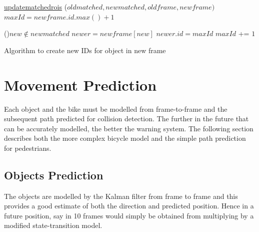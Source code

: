 \documentclass[11pt,twoside]{report}
\begin{document}
\begin{algorithm}
	\DontPrintSemicolon
	\SetAlgoLined
	\underline{update\textunderscore matched\textunderscore rois} ($old$\textunderscore$matched,new$\textunderscore$matched,old$\textunderscore$frame,new$\textunderscore$frame)$\;
	\texttt{\\}
	$maxId = new$\textunderscore$frame.id.max()+1$ 
	
	\ForEach(){$new \notin new$\textunderscore$matched$}{
		$newer = new$\textunderscore$frame[new]$ 
		$newer.id = maxId$ 
		$maxId$ += $1$ 
	}
	\texttt{\\}
	\caption{Algorithm to create new IDs for object in new frame}
	\label{alg:weights}
\end{algorithm}


\section{Movement Prediction}

Each object and the bike must be modelled from frame-to-frame and the subsequent path predicted for collision detection. The further in the future that can be accurately modelled, the better the warning system. The following section describes both the more complex bicycle model and the simple path prediction for pedestrians.

\subsection{Objects Prediction}
The objects are modelled by the Kalman filter from frame to frame and this provides a good estimate of both the direction and predicted position. Hence in a future position, say in 10 frames would simply be obtained from multiplying by a modified state-transition model.
\end{document}
